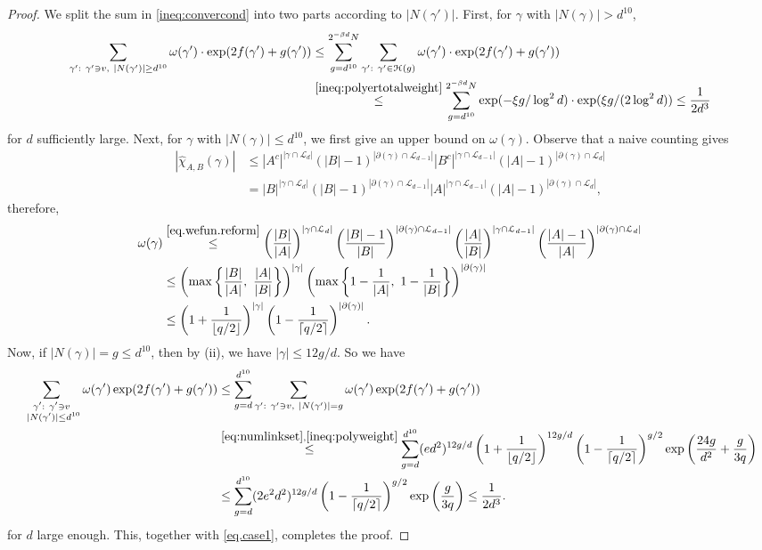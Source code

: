 \documentclass{amsart}
\theoremstyle{definition}
\newcommand{\we}{\omega}
\newcommand{\cH}{\mathcal{H} }
\newcommand{\cL}{\mathcal{L} }
\newcommand{\beq}[1]{\begin{equation}\label{#1}}
\newcommand{\enq}[0]{\end{equation}}
\newcommand{\nin}[0]{\noindent}
\newcommand{\0}[0]{\emptyset}
\begin{document}
\begin{proof}
\nin We split the sum in \eqref{ineq:convercond} into two parts according to $|N(\gamma')|$. 
First, for $\gamma$ with $|N(\gamma)| >d^{10}$, 
\beq{eq.case1}
\begin{split}
\sum_{\gamma':\ \gamma'\ni v,\ |N(\gamma')|\geq d^{10}}\we(\gamma')\cdot \exp(2f(\gamma')+g(\gamma'))
&\leq \sum_{g=d^{10}}^{2^{-\beta d}N}\sum_{\gamma':\ \gamma'\in \cH(g)}\we(\gamma')\cdot \exp(2f(\gamma')+g(\gamma'))\\
&\stackrel{\eqref{ineq:polyertotalweight}}{\leq} \sum_{g=d^{10}}^{2^{-\beta d}N}\exp(-\xi g/\log^2 d)\cdot\exp(\xi g/(2\log^2 d)) \leq \frac{1}{2d^3}
\end{split}
\enq
for $d$ sufficiently large. Next, for $\gamma$ with $|N(\gamma)| \le d^{10}$, we first give an upper bound on $\we(\gamma)$.  
Observe that a naive counting gives
\[
\begin{split}
|\hat{\chi}_{A, B}(\gamma)| 
&\leq |A^c|^{|\gamma\cap \cL_{d}|}(|B|-1)^{|\partial(\gamma)\cap \cL_{d-1}|}|B^c|^{|\gamma\cap \cL_{d-1}|}(|A|-1)^{|\partial(\gamma)\cap \cL_{d}|}\\
&= |B|^{|\gamma\cap \cL_{d}|}(|B|-1)^{|\partial(\gamma)\cap \cL_{d-1}|}|A|^{|\gamma\cap \cL_{d-1}|}(|A|-1)^{|\partial(\gamma)\cap \cL_{d}|},
\end{split}
\]
therefore,
\begin{equation}\label{ineq:polyweight}
\begin{split}
\we(\gamma) &\stackrel{\eqref{eq.wefun.reform}}{\leq} \left(\frac{|B|}{|A|}\right)^{|\gamma\cap \cL_{d}|}\left(\frac{|B|-1}{|B|}\right)^{|\partial(\gamma)\cap \cL_{d-1}|}\left(\frac{|A|}{|B|}\right)^{|\gamma\cap \cL_{d-1}|}\left(\frac{|A|-1}{|A|}\right)^{|\partial(\gamma)\cap \cL_{d}|}\\
&\leq \left(\max\left\{\frac{|B|}{|A|},\ \frac{|A|}{|B|}\right\}\right)^{|\gamma|}\left(\max\left\{1 - \frac{1}{|A|},\ 1 - \frac{1}{|B|}\right\}\right)^{|\partial(\gamma)|}\\
&\leq \left(1 + \frac{1}{\lfloor q/2 \rfloor}\right)^{|\gamma|}\left(1 - \frac{1}{\lceil q/2 \rceil}\right)^{|\partial(\gamma)|}.
\end{split}
\end{equation}
Now, if $|N(\gamma)|=g\leq d^{10}$, then by  (ii), we have 
$|\gamma|\leq 12g/d$. So we have
\[
\begin{split}
\sum_{\substack{\gamma':\ \gamma'\ni v \\   
\   |N(\gamma')|\leq d^{10}}}\we(\gamma')\exp(2f(\gamma')+g(\gamma'))
&\leq \sum_{g=d}^{d^{10}}\sum_{\gamma':\ \gamma'\ni v,\ |N(\gamma')|=g}\we(\gamma')\exp(2f(\gamma')+g(\gamma'))\\
&\stackrel{\eqref{eq:numlinkset}, \eqref{ineq:polyweight}}{\leq} \sum_{g=d}^{d^{10}}(ed^2)^{12g/d}\left(1 + \frac{1}{\lfloor q/2 \rfloor}\right)^{12g/d}\left(1 - \frac{1}{\lceil q/2 \rceil}\right)^{g/2}\exp\left(\frac{24g}{d^2} + \frac{g}{3q}\right)\\
&\leq \sum_{g=d}^{d^{10}}(2e^2d^2)^{12g/d}\left(1 - \frac{1}{\lceil q/2 \rceil}\right)^{g/2}\exp\left(\frac{g}{3q}\right) \le \frac{1}{2d^3}.
\end{split}
\]
for $d$ large enough. This, together with \eqref{eq.case1}, completes the proof.
\end{proof}
\end{document}
